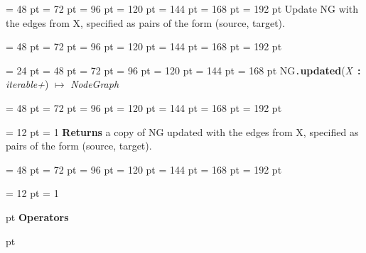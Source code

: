 {{{{\par \noindent  \leftskip = 48 pt  \leftmargini = 72 pt  \leftmarginii = 96 pt  \leftmarginiii = 120 pt  \leftmarginiv = 144 pt  \leftmarginv = 168 pt  \leftmarginvi = 192 pt  Update NG with the edges from X,
specified as pairs of the form (source, target).\par}
{\par \noindent  \leftskip = 48 pt  \leftmargini = 72 pt  \leftmarginii = 96 pt  \leftmarginiii = 120 pt  \leftmarginiv = 144 pt  \leftmarginv = 168 pt  \leftmarginvi = 192 pt {\par \noindent
\par}
\par}
\par}
\par}
{\par \noindent  \leftskip = 24 pt  \leftmargini = 48 pt  \leftmarginii = 72 pt  \leftmarginiii = 96 pt  \leftmarginiv = 120 pt  \leftmarginv = 144 pt  \leftmarginvi = 168 pt NG{\tt .\/}{\bf {\large {\bf updated\/}}\/}({\em X\/}~{\bf :}  {\em iterable+\/}) \(\mapsto \)  {\em NodeGraph\/}{\par \noindent
{\par \noindent  \leftskip = 48 pt  \leftmargini = 72 pt  \leftmarginii = 96 pt  \leftmarginiii = 120 pt  \leftmarginiv = 144 pt  \leftmarginv = 168 pt  \leftmarginvi = 192 pt {\par \noindent
{\par \pagebreak[3.100000] \noindent \hangindent = 12 pt \hangafter = 1 
{\bf Returns \/} a copy of NG updated with the edges from X,
specified as pairs of the form (source, target).\par}
\par}
\par}
{\par \noindent  \leftskip = 48 pt  \leftmargini = 72 pt  \leftmarginii = 96 pt  \leftmarginiii = 120 pt  \leftmarginiv = 144 pt  \leftmarginv = 168 pt  \leftmarginvi = 192 pt {\par \noindent
\par}
\par}
\par}
\par}
{\par \pagebreak[3.300000] \noindent \hangindent = 12 pt \hangafter = 1 
{\par \pagebreak[3]  pt \noindent
{\Large {\bf Operators\/}}\par {} pt
} \noindent
\par}
}
